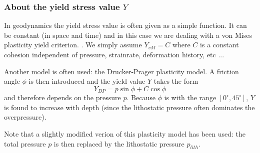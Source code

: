 \subsubsection{About the yield stress value $Y$}

In geodynamics the yield stress value is often given as a simple function. 
It can be constant (in space and time) and in this case we are dealing with a von Mises plasticity yield criterion. 
. We simply assume $Y_{vM}=C$ where $C$ is a constant cohesion independent of pressure, strainrate,
deformation history, etc ... 

Another model is often used: the Drucker-Prager plasticity model. 
A friction angle $\phi$ is then introduced and the yield value $Y$ takes the form
\[
Y_{DP}=p \sin\phi + C \cos \phi
\]
and therefore depends on the pressure $p$. Because $\phi$ is with the range $[0^\circ,45^\circ]$, $Y$ is
found to increase with depth (since the lithostatic pressure often dominates the overpressure).

Note that a slightly modified verion of this plasticity model has been used: the total pressure $p$
is then replaced by the lithostatic pressure $p_{lith}$.







